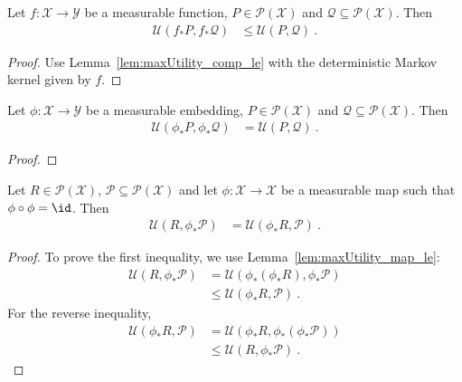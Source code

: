 \begin{lemma}\label{lem:maxUtility_map_le}
  \leanok
Let $f : \mathcal{X} \to \mathcal{Y}$ be a measurable function, $P \in \mathcal{P}(\mathcal{X})$ and $\mathcal{Q} \subseteq \mathcal{P}(\mathcal{X})$.
Then
\begin{align*}
  \mathcal{U}(f_*P, f_* \mathcal{Q})
  &\le \mathcal{U}(P, \mathcal{Q})
  \: .
\end{align*}
\end{lemma}

\begin{proof}\leanok
Use Lemma~\ref{lem:maxUtility_comp_le} with the deterministic Markov kernel given by $f$.
\end{proof}


\begin{lemma}\label{lem:maxUtility_map_eq}
  \leanok
Let $\phi : \mathcal{X} \to \mathcal{Y}$ be a measurable embedding, $P \in \mathcal{P}(\mathcal{X})$ and $\mathcal{Q} \subseteq \mathcal{P}(\mathcal{X})$.
Then
\begin{align*}
  \mathcal{U}(\phi_* P, \phi_* \mathcal{Q})
  &= \mathcal{U}(P, \mathcal{Q})
  \: .
\end{align*}
\end{lemma}

\begin{proof}\leanok

\end{proof}


\begin{lemma}\label{lem:maxUtility_map_swap}
  \leanok
Let $R \in \mathcal{P}(\mathcal{X})$, $\mathcal{P} \subseteq \mathcal{P}(\mathcal{X})$ and let $\phi : \mathcal{X} \to \mathcal{X}$ be a measurable map such that $\phi \circ \phi = \id$.
Then
\begin{align*}
  \mathcal{U}(R, \phi_* \mathcal{P})
  &= \mathcal{U}(\phi_* R, \mathcal{P})
  \: .
\end{align*}
\end{lemma}

\begin{proof}\leanok
To prove the first inequality, we use Lemma~\ref{lem:maxUtility_map_le}:
\begin{align*}
  \mathcal{U}(R, \phi_* \mathcal{P})
  &= \mathcal{U}(\phi_* (\phi_* R), \phi_* \mathcal{P})
  \\
  &\le \mathcal{U}(\phi_* R, \mathcal{P})
  \: .
\end{align*}
For the reverse inequality,
\begin{align*}
  \mathcal{U}(\phi_* R, \mathcal{P})
  &= \mathcal{U}(\phi_* R, \phi_* (\phi_* \mathcal{P}))
  \\
  &\le \mathcal{U}(R, \phi_* \mathcal{P})
  \: .
\end{align*}
\end{proof}


